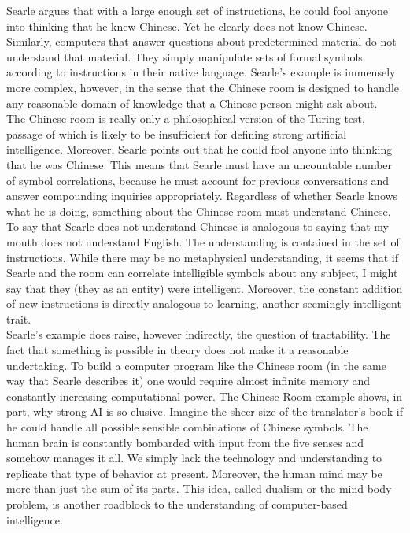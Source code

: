 Searle argues that with a large enough set of instructions, he could fool anyone
into thinking that he knew Chinese. Yet he clearly does not know Chinese. Similarly,
computers that answer questions about predetermined material do not understand that
material. They simply manipulate sets of formal symbols according to instructions in
their native language. Searle’s example is immensely more complex, however, in the
sense that the Chinese room is designed to handle any reasonable domain of knowledge
that a Chinese person might ask about.\\
The Chinese room is really only a philosophical version of the Turing test,
passage of which is likely to be insufficient for defining strong artificial intelligence.
Moreover, Searle points out that he could fool anyone into thinking that he was Chinese.
This means that Searle must have an uncountable number of symbol correlations, because
he must account for previous conversations and answer compounding inquiries
appropriately. Regardless of whether Searle knows what he is doing, something about
the Chinese room must understand Chinese. To say that Searle does not understand
Chinese is analogous to saying that my mouth does not understand English. The
understanding is contained in the set of instructions. While there may be no metaphysical
understanding, it seems that if Searle and the room can correlate intelligible symbols
about any subject, I might say that they (they as an entity) were intelligent. Moreover,
the constant addition of new instructions is directly analogous to learning, another
seemingly intelligent trait.\\
Searle’s example does raise, however indirectly, the question of tractability. The
fact that something is possible in theory does not make it a reasonable undertaking. To
build a computer program like the Chinese room (in the same way that Searle describes
it) one would require almost infinite memory and constantly increasing computational
power. The Chinese Room example shows, in part, why strong AI is so elusive. Imagine
the sheer size of the translator’s book if he could handle all possible sensible
combinations of Chinese symbols. The human brain is constantly bombarded with input
from the five senses and somehow manages it all. We simply lack the technology and
understanding to replicate that type of behavior at present. Moreover, the human mind
may be more than just the sum of its parts. This idea, called dualism or the mind-body
problem, is another roadblock to the understanding of computer-based intelligence.


